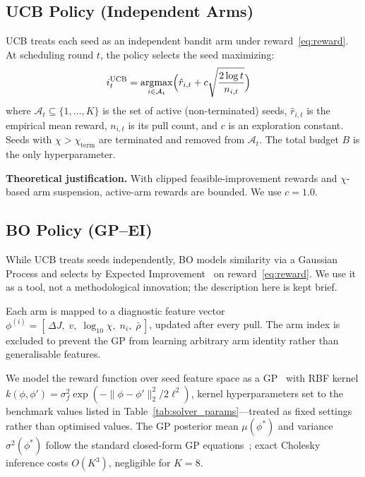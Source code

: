 \documentclass[lettersize,journal]{IEEEtran}
\DeclareMathOperator*{\argmax}{argmax}
\begin{document}
\subsection{UCB Policy (Independent Arms)}

UCB treats each seed as an independent bandit arm under reward~\eqref{eq:reward}. At scheduling round $t$, the policy selects the seed maximizing:
\begin{equation}
\begin{aligned}
i_t^{\text{UCB}} &= \argmax_{i \in \mathcal{A}_t} \Bigl( \hat{r}_{i,t}
   + c \sqrt{\frac{2\log t}{n_{i,t}}} \Bigr)
\end{aligned}
\label{eq:ucb_chi}
\end{equation}
where $\mathcal{A}_t \subseteq \{1,\dots,K\}$ is the set of active (non-terminated) seeds, $\hat{r}_{i,t}$ is the empirical mean reward, $n_{i,t}$ is its pull count, and $c$ is an exploration constant. Seeds with $\chi > \chi_{\text{term}}$ are terminated and removed from $\mathcal{A}_t$. The total budget $B$ is the only hyperparameter.

\noindent\textbf{Theoretical justification.}
With clipped feasible-improvement rewards and $\chi$-based arm suspension, active-arm rewards are bounded. We use $c=1.0$.

\subsection{BO Policy (GP--EI)}
\label{sec:bo_policy}

While UCB treats seeds independently, BO models similarity via a Gaussian Process and selects by Expected Improvement~\cite{srinivas2010} on reward~\eqref{eq:reward}.  We use it as a tool, not a methodological innovation; the description here is kept brief.

Each arm is mapped to a diagnostic feature vector
$\phi^{(i)} = [\, \Delta J,\; v,\; \log_{10}\chi,\; n_i,\; \bar\rho \,]$,
updated after every pull.  The arm index is excluded to prevent the GP from
learning arbitrary arm identity rather than generalisable features.

We model the reward function over seed feature space as a GP~\cite{rasmussen2006} with RBF kernel $k(\phi, \phi') = \sigma_f^2 \exp(-\|\phi - \phi'\|_2^2 / 2\ell^2)$,
kernel hyperparameters set to the benchmark values listed in Table~\ref{tab:solver_params}---treated as fixed settings rather than optimised values.  The GP posterior mean $\mu(\phi^*)$ and variance $\sigma^2(\phi^*)$ follow the standard closed-form GP equations~\cite{rasmussen2006}; exact Cholesky inference costs $O(K^3)$, negligible for $K=8$.
\end{document}
